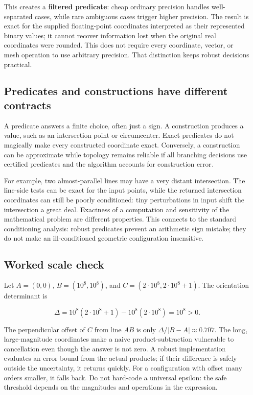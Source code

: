 This creates a \textbf{filtered predicate}: cheap ordinary precision handles well-separated cases, while rare ambiguous cases trigger higher precision. The result is exact for the supplied floating-point coordinates interpreted as their represented binary values; it cannot recover information lost when the original real coordinates were rounded. This does not require every coordinate, vector, or mesh operation to use arbitrary precision. That distinction keeps robust decisions practical.

\subsection{Predicates and constructions have different contracts}\label{02-foundations-ii-ch034-predicates-and-constructions-have-different-contracts}

A predicate answers a finite choice, often just a sign. A construction produces a value, such as an intersection point or circumcenter. Exact predicates do not magically make every constructed coordinate exact. Conversely, a construction can be approximate while topology remains reliable if all branching decisions use certified predicates and the algorithm accounts for construction error.

For example, two almost-parallel lines may have a very distant intersection. The line-side tests can be exact for the input points, while the returned intersection coordinates can still be poorly conditioned: tiny perturbations in input shift the intersection a great deal. Exactness of a computation and sensitivity of the mathematical problem are different properties. This connects to the standard conditioning analysis: robust predicates prevent an arithmetic sign mistake; they do not make an ill-conditioned geometric configuration insensitive.

\subsection{Worked scale check}\label{02-foundations-ii-ch034-worked-scale-check}

Let \(A=(0,0)\), \(B=(10^8,10^8)\), and \(C=(2\cdot10^8,2\cdot10^8+1)\). The orientation determinant is

\[
\Delta=10^8(2\cdot10^8+1)-10^8(2\cdot10^8)=10^8>0.
\]

The perpendicular offset of \(C\) from line \(AB\) is only \(\Delta/|B-A|\approx0.707\). The long, large-magnitude coordinates make a naive product-subtraction vulnerable to cancellation even though the answer is not zero. A robust implementation evaluates an error bound from the actual products; if their difference is safely outside the uncertainty, it returns quickly. For a configuration with offset many orders smaller, it falls back. Do not hard-code a universal epsilon: the safe threshold depends on the magnitudes and operations in the expression.

